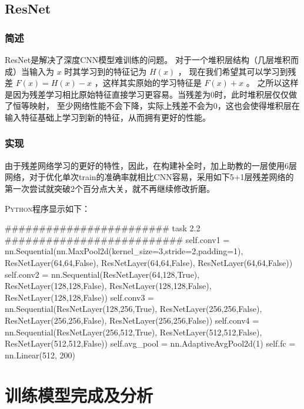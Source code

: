 \documentclass[a4paper,AutoFakeBold,AutoFakeSlant]{ctexart}
\begin{document}
\subsection{ResNet}
\subsubsection{简述}
ResNet是解决了深度CNN模型难训练的问题。
对于一个堆积层结构（几层堆积而成）当输入为 $x$ 时其学习到的特征记为 $H(x)$ ，
现在我们希望其可以学习到残差 $F(x) = H(x) - x$ ，这样其实原始的学习特征是 $F(x)+x$ 。
之所以这样是因为残差学习相比原始特征直接学习更容易。当残差为0时，此时堆积层仅仅做了恒等映射，
至少网络性能不会下降，实际上残差不会为0，这也会使得堆积层在输入特征基础上学习到新的特征，从而拥有更好的性能。

\subsubsection{实现}
由于残差网络学习的更好的特性，因此，在构建补全时，加上助教的一层使用6层网络，对于优化单次train的准确率就相比CNN容易，采用如下5+1层残差网络的
第一次尝试就突破2个百分点大关，就不再继续修改折磨。

\textsc{Python}程序显示如下：
\begin{python}
  ######################## task 2.2 ##########################
  self.conv1 = nn.Sequential(nn.MaxPool2d(kernel_size=3,stride=2,padding=1),
                             ResNetLayer(64,64,False),
                             ResNetLayer(64,64,False),
                             ResNetLayer(64,64,False))
  self.conv2 = nn.Sequential(ResNetLayer(64,128,True),
                             ResNetLayer(128,128,False),
                             ResNetLayer(128,128,False),
                             ResNetLayer(128,128,False))
  self.conv3 = nn.Sequential(ResNetLayer(128,256,True),
                             ResNetLayer(256,256,False),
                             ResNetLayer(256,256,False),
                             ResNetLayer(256,256,False))
  self.conv4 = nn.Sequential(ResNetLayer(256,512,True),
                             ResNetLayer(512,512,False),
                             ResNetLayer(512,512,False))
  self.avg_pool = nn.AdaptiveAvgPool2d(1)
  self.fc = nn.Linear(512, 200)
\end{python}



\section{训练模型完成及分析}
\end{document}
